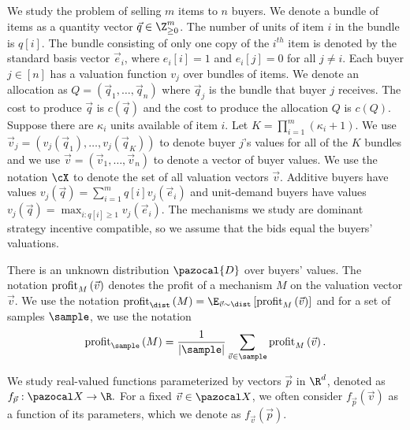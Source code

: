 
We study the problem of selling $m$ items to $n$ buyers. We denote a bundle of items as a quantity vector $\vec{q} \in \Z_{\geq 0}^m$. The number of units of item $i$ in the bundle is $q[i]$. The bundle consisting of only one copy of the $i^{th}$ item is denoted by the standard basis vector $\vec{e}_i$, where $e_i[i] = 1$ and $e_i[j] = 0$ for all $j \not= i$. Each buyer $j \in [n]$ has a valuation function $v_j$ over bundles of items. We denote an allocation as $Q = \left(\vec{q}_1, \dots, \vec{q}_n\right)$ where $\vec{q}_j$ is the bundle that buyer $j$ receives. The cost to produce $\vec{q}$ is $c\left(\vec{q}\right)$ and the cost to produce the allocation $Q$ is $c\left(Q\right)$.
Suppose there are $\kappa_i$ units available of item $i$. Let $K = \prod_{i = 1}^m \left(\kappa_i+1\right)$. We use $\vec{v}_j = \left(v_j\left(\vec{q}_1\right), \dots, v_j\left(\vec{q}_K\right)\right)$ to denote buyer $j$'s values for all of the $K$ bundles and we use $\vec{v} = \left(\vec{v}_1, \dots, \vec{v}_n\right)$ to denote a vector of buyer values. We use the notation $\cX$ to denote the set of all valuation vectors $\vec{v}$. Additive buyers have values $v_j\left(\vec{q}\right) = \sum_{i = 1}^m q[i] v_j\left(\vec{e}_i\right)$ and unit-demand buyers have values $v_j\left(\vec{q}\right) = \max_{i : q[i] \geq 1} v_j\left(\vec{e}_i\right)$. The mechanisms  we study are dominant strategy incentive compatible, so we assume that the bids equal the buyers' valuations.

There is an unknown distribution $\pazocal{D}$ over buyers' values. 
The notation $\textnormal{profit}_M\left(\vec{v}\right)$ denotes the profit of a mechanism $M$ on the valuation vector $\vec{v}$. We use the notation $\profit_{\dist}\left(M\right) = \E_{\vec{v} \sim \dist}\left[\profit_M\left(\vec{v}\right)\right]$ and for a set of samples $\sample$, we use the notation \[\profit_{\sample}\left(M\right) = \frac{1}{|\sample|}\sum_{\vec{v} \in \sample}\profit_M\left(\vec{v}\right).\]

We study real-valued functions parameterized by vectors $\vec{p}$ in $\R^d$, denoted as $f_{\vec{p}}:\domain \to \R.$ For a fixed $\vec{v} \in \domain$, we often consider $f_{\vec{p}}\left(\vec{v}\right)$ as a function of its parameters, which we denote as $f_{\vec{v}}\left(\vec{p}\right)$.
